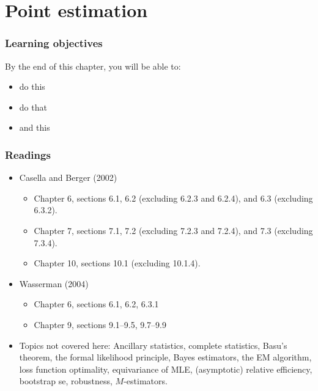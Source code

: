 \documentclass[
]{book}
\providecommand{\tightlist}{%
  \setlength{\itemsep}{0pt}\setlength{\parskip}{0pt}}
\theoremstyle{definition}
\theoremstyle{definition}
\theoremstyle{definition}
\theoremstyle{definition}
\theoremstyle{remark}
\begin{document}
\hypertarget{point-estimation}{%
\chapter{Point estimation}\label{point-estimation}}

\hypertarget{learning-objectives-3}{%
\subsection*{Learning objectives}\label{learning-objectives-3}}

By the end of this chapter, you will be able to:

\begin{itemize}
\tightlist
\item
  do this
\item
  do that
\item
  and this
\end{itemize}

\hypertarget{readings-3}{%
\subsection*{Readings}\label{readings-3}}

\begin{itemize}
\tightlist
\item
  Casella and Berger (2002)

  \begin{itemize}
  \tightlist
  \item
    Chapter 6, sections 6.1, 6.2 (excluding 6.2.3 and 6.2.4), and 6.3 (excluding 6.3.2).
  \item
    Chapter 7, sections 7.1, 7.2 (excluding 7.2.3 and 7.2.4), and 7.3 (excluding 7.3.4).
  \item
    Chapter 10, sections 10.1 (excluding 10.1.4).
  \end{itemize}
\item
  Wasserman (2004)

  \begin{itemize}
  \tightlist
  \item
    Chapter 6, sections 6.1, 6.2, 6.3.1
  \item
    Chapter 9, sections 9.1--9.5, 9.7--9.9
  \end{itemize}
\item
  Topics not covered here: Ancillary statistics, complete statistics, Basu's theorem, the formal likelihood principle, Bayes estimators, the EM algorithm, loss function optimality, equivariance of MLE, (asymptotic) relative efficiency, bootstrap se, robustness, \(M\)-estimators.
\end{itemize}
\end{document}
